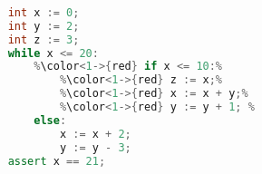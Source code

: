 \begin{lstlisting}[language=C++, style=withAssert]  % Start your code-block
	
	int x := 0;
	int y := 2;
	int z := 3;
	while x <= 20:
		%\color<1->{red} if x <= 10:%
			%\color<1->{red} z := x;%
			%\color<1->{red} x := x + y;%
			%\color<1->{red} y := y + 1; %
		else:
			x := x + 2;
			y := y - 3;
	assert x == 21;
	\end{lstlisting}